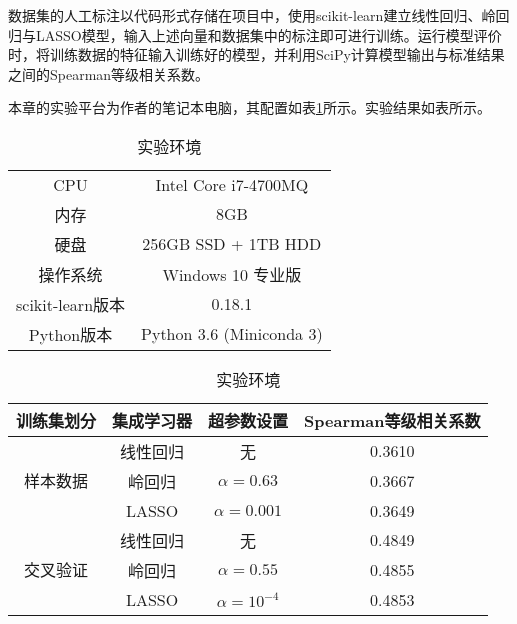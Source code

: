 数据集的人工标注以代码形式存储在项目中，使用scikit-learn建立线性回归、岭回归与LASSO模型，输入上述向量和数据集中的标注即可进行训练。运行模型评价时，将训练数据的特征输入训练好的模型，并利用SciPy计算模型输出与标准结果之间的Spearman等级相关系数。

本章的实验平台为作者的笔记本电脑，其配置如表\ref{t:local environment}所示。实验结果如表所示。

\begin{table}[h]
	\caption{实验环境}
	\label{t:local environment}
	\vspace{0.5em}\centering\wuhao
	\begin{tabular}{cc}
		\toprule[1.5pt]
		CPU & Intel Core i7-4700MQ \\
		内存 & 8GB \\
		硬盘 & 256GB SSD + 1TB HDD \\
		操作系统 & Windows 10 专业版 \\
		scikit-learn版本 & 0.18.1 \\
		Python版本 & Python 3.6 (Miniconda 3) \\
		\bottomrule[1.5pt]
	\end{tabular}
\end{table}

\begin{table}[h]
	\caption{实验环境}
	\label{t:ensemble result}
	\vspace{0.5em}\centering\wuhao
	\begin{tabular}{cccc}
		\toprule[1.5pt]
		训练集划分 & 集成学习器 & 超参数设置 & Spearman等级相关系数 \\
		\midrule[1pt]
		\multirow{3}{*}{样本数据} & 线性回归 & 无 & 0.3610 \\
		& 岭回归 & $\alpha = 0.63$ & 0.3667 \\
		& LASSO & $\alpha = 0.001$ & 0.3649 \\
		\hline
		\multirow{3}{*}{交叉验证} & 线性回归 & 无 & 0.4849 \\
		& 岭回归 & $\alpha = 0.55$ & 0.4855 \\
		& LASSO & $\alpha = 10^{-4}$ & 0.4853 \\
		\bottomrule[1.5pt]
	\end{tabular}
\end{table}
